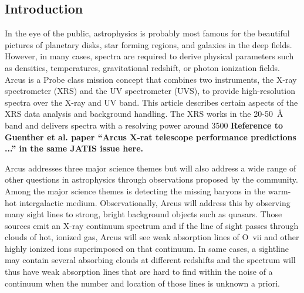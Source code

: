 \documentclass[12pt]{spieman}  %
\begin{document}
\begin{spacing}{2}   %


\section{Introduction}
\label{sect:intro}  %
In the eye of the public, astrophysics is probably most famous for the beautiful pictures of planetary disks, star forming regions, and galaxies in the deep fields. However, in many cases, spectra are required to derive physical parameters such as densities, temperatures, gravitational redshift, or photon ionization fields. Arcus is a Probe class mission concept that combines two instruments, the X-ray spectrometer (XRS) and the UV spectrometer (UVS), to provide high-resolution spectra over the X-ray and UV band. This article describes certain aspects of the XRS data analysis and background handling. The XRS works in the 20-50~\AA{} band and delivers spectra with a resolving power around 3500 \textbf{Reference to Guenther et al. paper ``Arcus X-rat telescope performance predictions ...'' in the same JATIS issue here.}


Arcus addresses three major science themes but will also address a wide range of other questions in astrophysics through observations proposed by the community. Among the major science themes is detecting the missing baryons in the warm-hot intergalactic medium. Observationally, Arcus will address this by observing many sight lines to strong, bright background objects such as quasars. Those sources emit an X-ray continuum spectrum and if the line of sight passes through clouds of hot, ionized gas, Arcus will see weak absorption lines of O~{\sc vii} and other highly ionized ions superimposed on that continuum. In same cases, a sightline may contain several absorbing clouds at different redshifts\cite{10.1117/12.2231193} and the spectrum will thus have weak absorption lines that are hard to find within the noise of a continuum when the number and location of those lines is unknown a priori.


\end{spacing}
\end{document}
